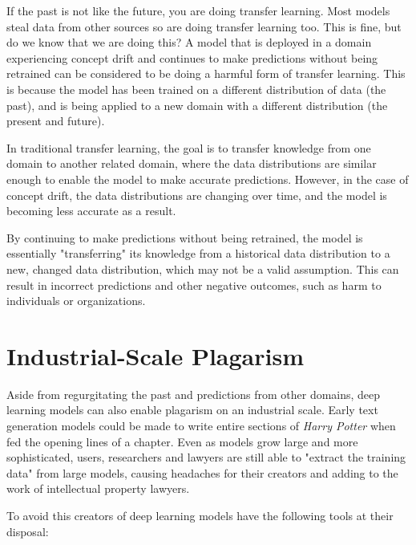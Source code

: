 If the past is not like the future, you are doing transfer learning. Most models steal data from other sources so are doing transfer learning too. This is fine, but do we know that we are doing this? A model that is deployed in a domain experiencing concept drift and continues to make predictions without being retrained can be considered to be doing a harmful form of transfer learning. This is because the model has been trained on a different distribution of data (the past), and is being applied to a new domain with a different distribution (the present and future).

In traditional transfer learning, the goal is to transfer knowledge from one domain to another related domain, where the data distributions are similar enough to enable the model to make accurate predictions. However, in the case of concept drift, the data distributions are changing over time, and the model is becoming less accurate as a result. 

By continuing to make predictions without being retrained, the model is essentially "transferring" its knowledge from a historical data distribution to a new, changed data distribution, which may not be a valid assumption. This can result in incorrect predictions and other negative outcomes, such as harm to individuals or organizations. 

\section{Industrial-Scale Plagarism}

Aside from regurgitating the past and predictions from other domains, deep learning models can also enable plagarism on an industrial scale. Early text generation models could be made to write entire sections of \textit{Harry Potter} when fed the opening lines of a chapter. Even as models grow large and more sophisticated, users, researchers and lawyers are still able to "extract the training data"  from large models, causing headaches for their creators and adding to the work of intellectual property lawyers. 


To avoid this creators of deep learning models have the following tools at their disposal:

